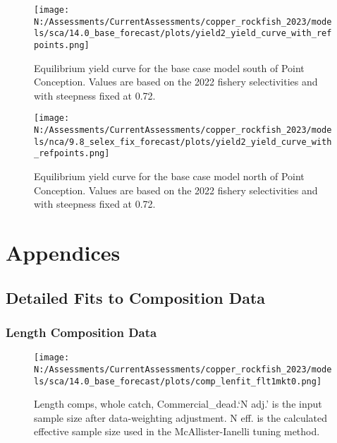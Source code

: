 \documentclass[11pt,
  english,
  letterpaper,
]{article}
\begin{document}
\pagebreak

\begin{figure}
\centering
\texttt{[image: N:/Assessments/CurrentAssessments/copper\_rockfish\_2023/models/sca/14.0\_base\_forecast/plots/yield2\_yield\_curve\_with\_refpoints.png]}
\caption{Equilibrium yield curve for the base case model south of Point Conception. Values are based on the 2022 fishery selectivities and with steepness fixed at 0.72.\label{fig:yield-south}}
\end{figure}

\pagebreak

\begin{figure}
\centering
\texttt{[image: N:/Assessments/CurrentAssessments/copper\_rockfish\_2023/models/nca/9.8\_selex\_fix\_forecast/plots/yield2\_yield\_curve\_with\_refpoints.png]}
\caption{Equilibrium yield curve for the base case model north of Point Conception. Values are based on the 2022 fishery selectivities and with steepness fixed at 0.72.\label{fig:yield-north}}
\end{figure}

\pagebreak

\hypertarget{appendices}{%
\section{Appendices}\label{appendices}}

\hypertarget{detailed-fit-comps}{%
\subsection{Detailed Fits to Composition Data}\label{detailed-fit-comps}}

\hypertarget{length-data}{%
\subsubsection{Length Composition Data}\label{length-data}}

\begin{figure}
\centering
\texttt{[image: N:/Assessments/CurrentAssessments/copper\_rockfish\_2023/models/sca/14.0\_base\_forecast/plots/comp\_lenfit\_flt1mkt0.png]}
\caption{Length comps, whole catch, Commercial\_dead.`N adj.' is the input sample size after data-weighting adjustment. N eff. is the calculated effective sample size used in the McAllister-Ianelli tuning method.\label{fig:comp_lenfit_flt1mkt0}}
\end{figure}
\end{document}
